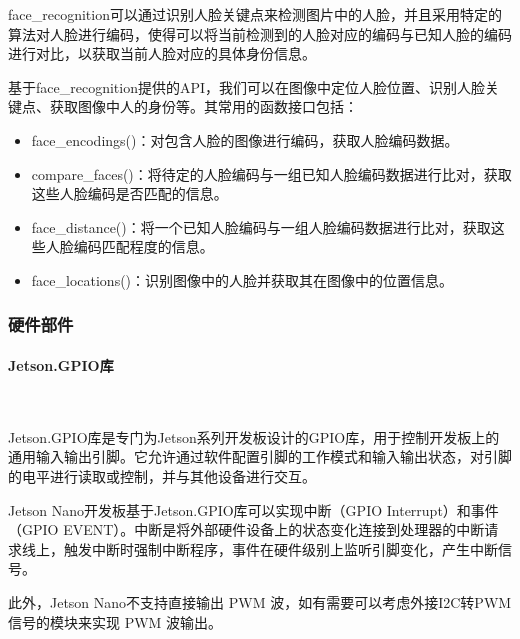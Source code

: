 \documentclass[UTF8]{article}
\begin{document}
face\_recognition可以通过识别人脸关键点来检测图片中的人脸，并且采用特定的算法对人脸进行编码，使得可以将当前检测到的人脸对应的编码与已知人脸的编码进行对比，以获取当前人脸对应的具体身份信息。

基于face\_recognition提供的API，我们可以在图像中定位人脸位置、识别人脸关键点、获取图像中人的身份等。其常用的函数接口包括：
\begin{itemize}
    \item face\_encodings()：对包含人脸的图像进行编码，获取人脸编码数据。
    \item compare\_faces()：将待定的人脸编码与一组已知人脸编码数据进行比对，获取这些人脸编码是否匹配的信息。
    \item face\_distance()：将一个已知人脸编码与一组人脸编码数据进行比对，获取这些人脸编码匹配程度的信息。
    \item face\_locations()：识别图像中的人脸并获取其在图像中的位置信息。
\end{itemize}

\subsubsection{硬件部件} 
\paragraph{Jetson.GPIO库}~{}

Jetson.GPIO库是专门为Jetson系列开发板设计的GPIO库，用于控制开发板上的通用输入输出引脚。它允许通过软件配置引脚的工作模式和输入输出状态，对引脚的电平进行读取或控制，并与其他设备进行交互。

Jetson Nano开发板基于Jetson.GPIO库可以实现中断（GPIO Interrupt）和事件（GPIO EVENT）。中断是将外部硬件设备上的状态变化连接到处理器的中断请求线上，触发中断时强制中断程序，事件在硬件级别上监听引脚变化，产生中断信号。

此外，Jetson Nano不支持直接输出 PWM 波，如有需要可以考虑外接I2C转PWM信号的模块来实现 PWM 波输出。


\end{document}
